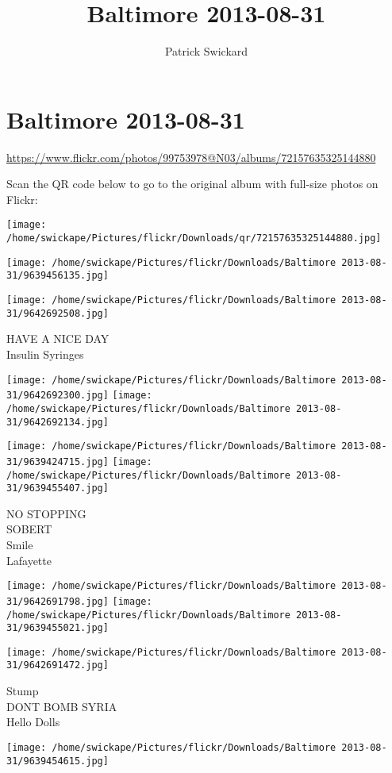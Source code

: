 \documentclass[10pt,letterpaper]{article}
\title{Baltimore 2013-08-31}
\author{Patrick Swickard}
\date{}
\begin{document}
\section*{Baltimore 2013-08-31}

\url{https://www.flickr.com/photos/99753978@N03/albums/72157635325144880}

Scan the QR code below to go to the original album with full-size photos on Flickr:

\texttt{[image: /home/swickape/Pictures/flickr/Downloads/qr/72157635325144880.jpg]}
\pagebreak

\texttt{[image: /home/swickape/Pictures/flickr/Downloads/Baltimore 2013-08-31/9639456135.jpg]}

\vspace{0.25in}
\texttt{[image: /home/swickape/Pictures/flickr/Downloads/Baltimore 2013-08-31/9642692508.jpg]}

HAVE A NICE DAY\\
Insulin Syringes
\pagebreak

\texttt{[image: /home/swickape/Pictures/flickr/Downloads/Baltimore 2013-08-31/9642692300.jpg]}
\texttt{[image: /home/swickape/Pictures/flickr/Downloads/Baltimore 2013-08-31/9642692134.jpg]}

\texttt{[image: /home/swickape/Pictures/flickr/Downloads/Baltimore 2013-08-31/9639424715.jpg]}
\texttt{[image: /home/swickape/Pictures/flickr/Downloads/Baltimore 2013-08-31/9639455407.jpg]}

NO STOPPING\\
SOBERT\\
Smile\\
Lafayette
\pagebreak

\texttt{[image: /home/swickape/Pictures/flickr/Downloads/Baltimore 2013-08-31/9642691798.jpg]}
\texttt{[image: /home/swickape/Pictures/flickr/Downloads/Baltimore 2013-08-31/9639455021.jpg]}

\texttt{[image: /home/swickape/Pictures/flickr/Downloads/Baltimore 2013-08-31/9642691472.jpg]}

Stump\\
DONT BOMB SYRIA\\
Hello Dolls
\pagebreak

\texttt{[image: /home/swickape/Pictures/flickr/Downloads/Baltimore 2013-08-31/9639454615.jpg]}
\end{document}
